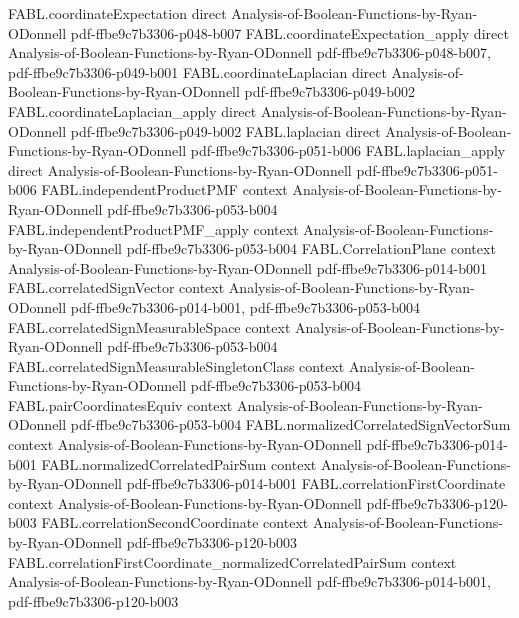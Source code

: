 \begin{theorem}
\proofstep
  {FABL.coordinateExpectation}
  {direct}
  {Analysis-of-Boolean-Functions-by-Ryan-ODonnell}
  {pdf-ffbe9c7b3306-p048-b007}
\proofstep
  {FABL.coordinateExpectation_apply}
  {direct}
  {Analysis-of-Boolean-Functions-by-Ryan-ODonnell}
  {pdf-ffbe9c7b3306-p048-b007,
    pdf-ffbe9c7b3306-p049-b001}
\proofstep
  {FABL.coordinateLaplacian}
  {direct}
  {Analysis-of-Boolean-Functions-by-Ryan-ODonnell}
  {pdf-ffbe9c7b3306-p049-b002}
\proofstep
  {FABL.coordinateLaplacian_apply}
  {direct}
  {Analysis-of-Boolean-Functions-by-Ryan-ODonnell}
  {pdf-ffbe9c7b3306-p049-b002}
\proofstep
  {FABL.laplacian}
  {direct}
  {Analysis-of-Boolean-Functions-by-Ryan-ODonnell}
  {pdf-ffbe9c7b3306-p051-b006}
\proofstep
  {FABL.laplacian_apply}
  {direct}
  {Analysis-of-Boolean-Functions-by-Ryan-ODonnell}
  {pdf-ffbe9c7b3306-p051-b006}
\proofstep
  {FABL.independentProductPMF}
  {context}
  {Analysis-of-Boolean-Functions-by-Ryan-ODonnell}
  {pdf-ffbe9c7b3306-p053-b004}
\proofstep
  {FABL.independentProductPMF_apply}
  {context}
  {Analysis-of-Boolean-Functions-by-Ryan-ODonnell}
  {pdf-ffbe9c7b3306-p053-b004}
\proofstep
  {FABL.CorrelationPlane}
  {context}
  {Analysis-of-Boolean-Functions-by-Ryan-ODonnell}
  {pdf-ffbe9c7b3306-p014-b001}
\proofstep
  {FABL.correlatedSignVector}
  {context}
  {Analysis-of-Boolean-Functions-by-Ryan-ODonnell}
  {pdf-ffbe9c7b3306-p014-b001,
    pdf-ffbe9c7b3306-p053-b004}
\proofstep
  {FABL.correlatedSignMeasurableSpace}
  {context}
  {Analysis-of-Boolean-Functions-by-Ryan-ODonnell}
  {pdf-ffbe9c7b3306-p053-b004}
\proofstep
  {FABL.correlatedSignMeasurableSingletonClass}
  {context}
  {Analysis-of-Boolean-Functions-by-Ryan-ODonnell}
  {pdf-ffbe9c7b3306-p053-b004}
\proofstep
  {FABL.pairCoordinatesEquiv}
  {context}
  {Analysis-of-Boolean-Functions-by-Ryan-ODonnell}
  {pdf-ffbe9c7b3306-p053-b004}
\proofstep
  {FABL.normalizedCorrelatedSignVectorSum}
  {context}
  {Analysis-of-Boolean-Functions-by-Ryan-ODonnell}
  {pdf-ffbe9c7b3306-p014-b001}
\proofstep
  {FABL.normalizedCorrelatedPairSum}
  {context}
  {Analysis-of-Boolean-Functions-by-Ryan-ODonnell}
  {pdf-ffbe9c7b3306-p014-b001}
\proofstep
  {FABL.correlationFirstCoordinate}
  {context}
  {Analysis-of-Boolean-Functions-by-Ryan-ODonnell}
  {pdf-ffbe9c7b3306-p120-b003}
\proofstep
  {FABL.correlationSecondCoordinate}
  {context}
  {Analysis-of-Boolean-Functions-by-Ryan-ODonnell}
  {pdf-ffbe9c7b3306-p120-b003}
\proofstep
  {FABL.correlationFirstCoordinate_normalizedCorrelatedPairSum}
  {context}
  {Analysis-of-Boolean-Functions-by-Ryan-ODonnell}
  {pdf-ffbe9c7b3306-p014-b001,
    pdf-ffbe9c7b3306-p120-b003}

\end{theorem}
